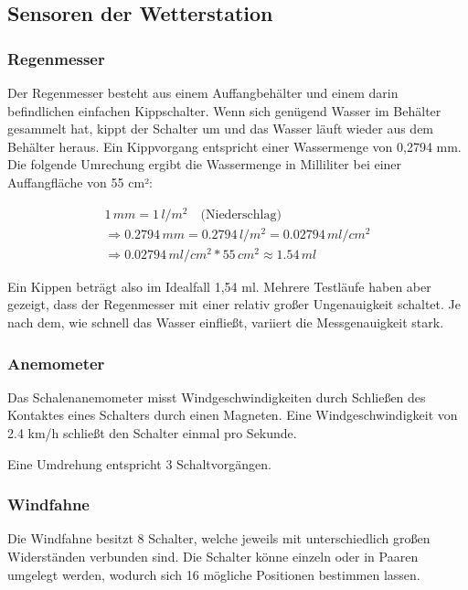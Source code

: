 \documentclass[12pt]{article}
\begin{document}

    \subsection{Sensoren der Wetterstation}

      \subsubsection{Regenmesser}

        Der Regenmesser besteht aus einem Auffangbehälter und einem darin befindlichen einfachen Kippschalter.
        Wenn sich genügend Wasser im Behälter gesammelt hat, kippt der Schalter um und das Wasser läuft wieder aus dem Behälter heraus.
        Ein Kippvorgang entspricht einer Wassermenge von 0,2794 mm.
        Die folgende Umrechung ergibt die Wassermenge in Milliliter bei einer Auffangfläche von 55 cm²:

        \begin{multline}
          1\,mm = 1\,l/m^2 \quad \text{(Niederschlag)} \\
          \Rightarrow 0.2794\,mm = 0.2794\,l/m^2 = 0.02794\,ml/cm^2 \\
          \Rightarrow 0.02794\,ml/cm^2 * 55\,cm^2 \approx 1.54\,ml
        \end{multline}

        Ein Kippen beträgt also im Idealfall 1,54 ml. Mehrere Testläufe haben aber gezeigt, dass der Regenmesser mit einer relativ großer Ungenauigkeit schaltet.
        Je nach dem, wie schnell das Wasser einfließt, variiert die Messgenauigkeit stark.

      \subsubsection{Anemometer}

        Das Schalenanemometer misst Windgeschwindigkeiten durch Schließen des Kontaktes eines Schalters durch einen Magneten.
        Eine Windgeschwindigkeit von 2.4 km/h schließt den Schalter einmal pro Sekunde.

        Eine Umdrehung entspricht 3 Schaltvorgängen.

      \subsubsection{Windfahne}

        Die Windfahne besitzt 8 Schalter, welche jeweils mit unterschiedlich großen Widerständen verbunden sind.
        Die Schalter könne einzeln oder in Paaren umgelegt werden, wodurch sich 16 mögliche Positionen bestimmen lassen.
\end{document}
